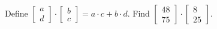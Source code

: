 Define $\begin{bmatrix} a \\ d \end{bmatrix}\cdot\begin{bmatrix} b \\ c \end{bmatrix}=a\cdot c+b\cdot d$. Find $\begin{bmatrix} 48 \\ 75 \end{bmatrix}\cdot\begin{bmatrix} 8 \\ 25 \end{bmatrix}$.
